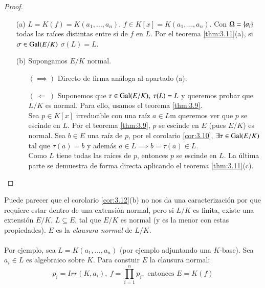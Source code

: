 \begin{proof}$ $
    \begin{itemize}
        \item[(a)] $L = K(f) = K(a_1, \ldots, a_n)$. $f \in K[x] = K(a_1, \ldots, a_n)$. Con $\Omega = \left\{a_i\right\}$ todas las raíces distintas entre sí de $f$ en $L$.
        Por el teorema \ref{thm:3.11}(a), si $\sigma \in \mathrm{Gal}(E/K)$ $\sigma(L)=L$.
        \item[(b)] Supongamos $E/K$ normal.
        \begin{itemize}
            \item[$(\implies)$] Directo de firma análoga al apartado (a).
            \item[$(\ \Longleftarrow \ )$] Suponemos que $\tau \in \mathrm{Gal}(E/K),\ \tau(L) = L$ y queremos probar que $L/K$ es normal. Para ello, usamos el teorema \ref{thm:3.9}.\\

            Sea $p \in K[x]$ irreducible con una raíz $a \in L$m queremos ver que $p$ se escinde en $L$. Por el teorema \ref{thm:3.9}, $p$ se escinde en $E$ (pues $E/K$) es normal. Sea $b \in E$ una raíz de $p$, por el corolario \ref{cor:3.10}, $\exists \tau \in \mathrm{Gal}(E/K)$ tal que $\tau(a) = b$ y además $a \in L \implies b = \tau(a) \in L$.\\

            Como $L$ tiene todas las raíces de $p$, entonces $p$ se escinde en $L$. La última parte se demuestra de forma directa aplicando el teorema \ref{thm:3.11}(c).
        \end{itemize}
    \end{itemize}
\end{proof}

\begin{obs}
    Puede parecer que el corolario \ref{cor:3.12}(b) no nos da una caracterización por que requiere estar dentro de una extensión normal, pero si $L/K$ es finita, existe una extensión $E/K$, $L \subseteq E$, tal que $E/K$ es normal (y es la menor con estas propiedades). $E$ es la \textit{clausura normal} de $L/K$.\\\\

    Por ejemplo, sea $L = K(a_1, \ldots, a_n)$ (por ejemplo adjuntando una $K$-base). Sea $a_i \in L$ es algebraico sobre $K$. Para constuir $E$ la clausura normal:
    $$
        p_i = Irr(K, a_i),\ f = \prod_{i=1}^{n} p_i, \text{ entonces } E = K(f)
    $$
\end{obs}

